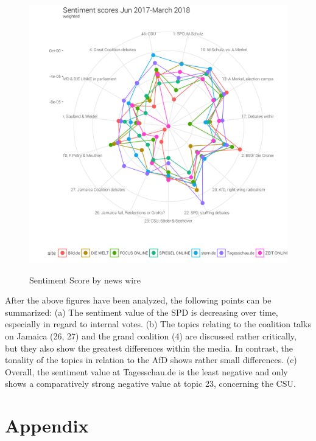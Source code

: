 \documentclass[12pt,a4paper,notitlepage]{article}
\begin{document}
\begin{figure}[H]
	\caption{Sentiment Score by news wire}
	\begin{center}
			\includegraphics[width=\textwidth,keepaspectratio]{../figs/sentscore_radar.png}
			\label{fig_sentscore_radar}
	\end{center}
\end{figure}

After the above figures have been analyzed, the following points can be summarized: (a) The sentiment value of the SPD is decreasing over time, especially in regard to internal votes. (b) The topics relating to the coalition talks on Jamaica (26, 27) and the grand coalition (4) are discussed rather critically, but they also show the greatest differences within the media. In contrast, the tonality of the topics in relation to the AfD shows rather small differences. (c) Overall, the sentiment value at Tagesschau.de is the least negative and only shows a comparatively strong negative value at topic 23, concerning the CSU. 

\section*{Appendix}
\end{document}
